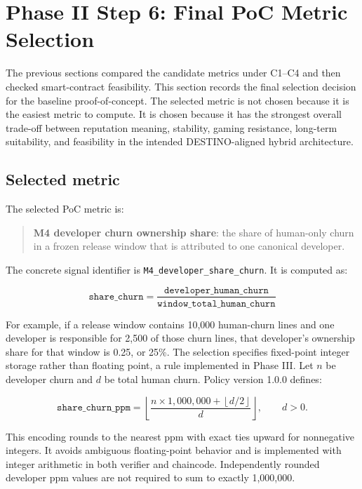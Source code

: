 \section{Phase II Step 6: Final PoC Metric Selection}
\label{sec:phase2_poc_metric_selection}

The previous sections compared the candidate metrics under C1--C4 and then checked smart-contract feasibility.
This section records the final selection decision for the baseline proof-of-concept. The selected metric is not
chosen because it is the easiest metric to compute. It is chosen because it has the strongest overall trade-off
between reputation meaning, stability, gaming resistance, long-term suitability, and feasibility in the intended
DESTINO-aligned hybrid architecture.

\subsection{Selected metric}
\label{sec:selected_metric_definition}

The selected PoC metric is:

\begin{quote}
\textbf{M4 developer churn ownership share}: the share of human-only churn in a frozen release window that is
attributed to one canonical developer.
\end{quote}

The concrete signal identifier is \texttt{M4\_developer\_share\_churn}. It is computed as:

\[
\texttt{share\_churn} =
\frac{\texttt{developer\_human\_churn}}
{\texttt{window\_total\_human\_churn}}
\]

For example, if a release window contains 10,000 human-churn lines and one developer is responsible for
2,500 of those churn lines, that developer's ownership share for that window is 0.25, or 25\%. The selection specifies
fixed-point integer storage rather than floating point, a rule implemented in Phase III. Let $n$ be developer churn and $d$ be
total human churn. Policy version 1.0.0 defines:

\[
\texttt{share\_churn\_ppm} =
\left\lfloor
\frac{n\times 1{,}000{,}000 + \left\lfloor d/2 \right\rfloor}{d}
\right\rfloor, \qquad d>0.
\]

This encoding rounds to the nearest ppm with exact ties upward for nonnegative integers. It avoids ambiguous
floating-point behavior and is implemented with integer arithmetic in both verifier and chaincode. Independently
rounded developer ppm values are not required to sum to exactly 1,000,000.

